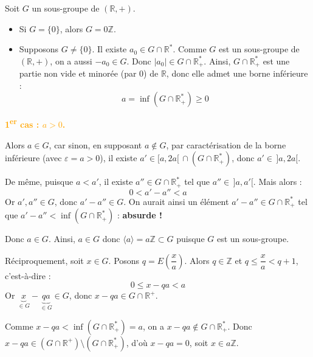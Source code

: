 \documentclass[a4paper,11pt]{article}
\newcommand{\R}{\mathbb{R}}
\newcommand{\Z}{\mathbb{Z}}
\newcommand{\cas}[1]{\textbf{\textcolor{orange}{#1}}}
\begin{document}
\begin{demonstration}
Soit $G$ un sous-groupe de $(\R, +)$.
\begin{itemize}
    \item Si $G = \{0\}$, alors $G = 0\Z$.
    \item Supposons $G \neq \{0\}$. Il existe $a_0 \in G \cap \R^*$. Comme $G$ est un sous-groupe de $(\R, +)$, on a aussi $-a_0 \in G$. Donc $|a_0| \in G \cap \R_+^*$. Ainsi, $G \cap \R_+^*$ est une partie non vide et minorée (par $0$) de $\R$, donc elle admet une borne inférieure :
    \[
    a = \inf(G \cap \R_+^*) \ge 0
    \]
\end{itemize}

\cas{1\textsuperscript{er} cas : $a > 0$.}

Alors $a \in G$, car sinon, en supposant $a \notin G$, par caractérisation de la borne inférieure (avec $\varepsilon = a > 0$), il existe $a' \in [a, 2a[ \, \cap (G \cap \R_+^*)$, donc $a' \in \, ]a, 2a[$.

\begin{center}
\end{center}

De même, puisque $a < a'$, il existe $a'' \in G \cap \R_+^*$ tel que $a'' \in \, ]a, a'[$. Mais alors :
\[
0 < a' - a'' < a
\]
Or $a', a'' \in G$, donc $a' - a'' \in G$. On aurait ainsi un élément $a' - a'' \in G \cap \R_+^*$ tel que $a' - a'' < \inf(G \cap \R_+^*)$ : \textbf{absurde !}

Donc $a \in G$. Ainsi, $a \in G$ donc $\langle a \rangle = a\Z \subset G$ puisque $G$ est un sous-groupe.

Réciproquement, soit $x \in G$. Posons $q = E\left(\dfrac{x}{a}\right)$. Alors $q \in \Z$ et $q \le \dfrac{x}{a} < q + 1$, c'est-à-dire :
\[
0 \le x - qa < a
\]
Or $\underbrace{x}_{\in G} - \underbrace{qa}_{\in G} \in G$, donc $x - qa \in G \cap \R^+$.

Comme $x - qa < \inf(G \cap \R_+^*) = a$, on a $x - qa \notin G \cap \R_+^*$. Donc $x - qa \in (G \cap \R^+) \setminus (G \cap \R_+^*)$, d'où $x - qa = 0$, soit $x \in a\Z$.


\end{demonstration}
\end{document}
